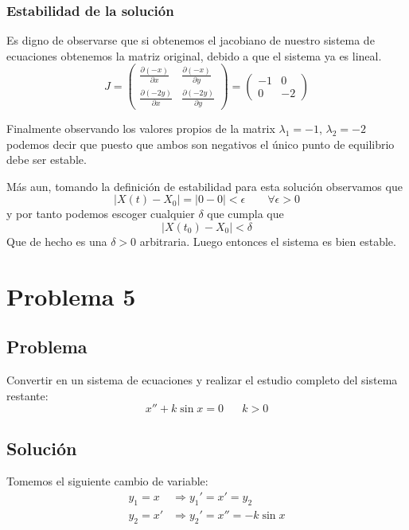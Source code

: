 \documentclass[10pt,letterpaper,titlepage]{article}
\begin{document}
\subsubsection{Estabilidad de la soluci\'on}

Es digno de observarse que si obtenemos el jacobiano de nuestro sistema de ecuaciones obtenemos la matriz original, debido a que el sistema ya es lineal.
\[
	J = \left(\begin{matrix}
		\frac{\partial (-x)}{\partial x} & \frac{\partial (-x)}{\partial y} \\
		\frac{\partial (-2y)}{\partial x} & \frac{\partial (-2y)}{\partial y}
	\end{matrix}\right) = \left(\begin{matrix}
		-1 & 0 \\
		0 & -2
	\end{matrix}\right)
\]

Finalmente observando los valores propios de la matrix $\lambda_1 = -1$, $\lambda_2 = -2$ podemos decir que puesto que ambos son negativos el único punto de equilibrio debe ser estable.

Más aun, tomando la definición de estabilidad para esta solución observamos que
\[
	|X(t) - X_0| = |0 - 0| < \epsilon \qquad \forall \epsilon>0
\]
y por tanto podemos escoger cualquier $\delta$ que cumpla que
\[
	|X(t_0) - X_0| < \delta
\]
Que de hecho es una $\delta>0$ arbitraria. Luego entonces el sistema es bien estable.

\section{Problema 5}

\subsection{Problema}
Convertir en un sistema de ecuaciones y realizar el estudio completo del sistema restante:
\begin{equation}
x'' + k \sin x = 0 \hspace{20pt} k>0
\end{equation}

\subsection{Solución}

Tomemos el siguiente cambio de variable:
\begin{equation}
	\begin{split}
		y_{1}=x & \Rightarrow y_{1}'=x'=y_{2} \\
		y_{2}=x' & \Rightarrow y_{2}'=x''= -k\sin x 
	\end{split}
\end{equation}
\end{document}
